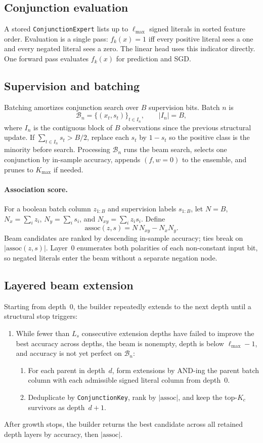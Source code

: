 \documentclass[11pt]{article}
\begin{document}
\subsection{Conjunction evaluation}
A stored \texttt{ConjunctionExpert} lists up to $\ell_{\max}$ signed literals
in sorted feature order.  Evaluation is a single pass: $f_k(x)=1$ iff every
positive literal sees a one and every negated literal sees a zero.  The linear
head uses this indicator directly.  One forward pass evaluates $f_k(x)$ for
prediction and SGD.

\subsection{Supervision and batching}
Batching amortizes conjunction search over $B$ supervision bits.  Batch $n$ is
\[
\mathcal B_n
=
\bigl\{(x_{t},s_{t})\bigr\}_{t\in I_n},
\qquad |I_n|=B,
\]
where $I_n$ is the contiguous block of $B$ observations since the previous
structural update.  If $\sum_{t\in I_n}s_t>B/2$, replace each $s_t$ by
$1-s_t$ so the positive class is the minority before search.  Processing
$\mathcal B_n$ runs the beam search, selects
one conjunction by in-sample accuracy, appends $(f,w=0)$ to the ensemble, and
prunes to $K_{\max}$ if needed.

\paragraph{Association score.}
For a boolean batch column $z_{1:B}$ and supervision labels $s_{1:B}$, let
$N=B$, $N_x=\sum_i z_i$, $N_y=\sum_i s_i$, and
$N_{xy}=\sum_i z_i s_i$.  Define
\[
\text{assoc}(z,s)=N\,N_{xy}-N_x N_y.
\]
Beam candidates are ranked by descending in-sample accuracy; ties break on
$|\text{assoc}(z,s)|$.  Layer~$0$ enumerates both polarities of each
non-constant input bit, so negated literals enter the beam without a separate
negation node.

\subsection{Layered beam extension}
Starting from depth~$0$, the builder repeatedly extends to the next depth until
a structural stop triggers:
\begin{enumerate}
  \item While fewer than $L_s$ consecutive extension depths have failed to
  improve the best accuracy across depths, the beam is nonempty, depth is below
  $\ell_{\max}-1$, and accuracy is not yet perfect on $\mathcal B_n$:
  \begin{enumerate}
  \item For each parent in depth~$d$, form extensions by AND-ing the parent
  batch column with each admissible signed literal column from depth~$0$.
  \item Deduplicate by \texttt{ConjunctionKey}, rank by $|\text{assoc}|$, and
  keep the top-$K_c$ survivors as depth~$d{+}1$.
  \end{enumerate}
\end{enumerate}
After growth stops, the builder returns the best candidate across all retained
depth layers by accuracy, then $|\text{assoc}|$.
\end{document}
